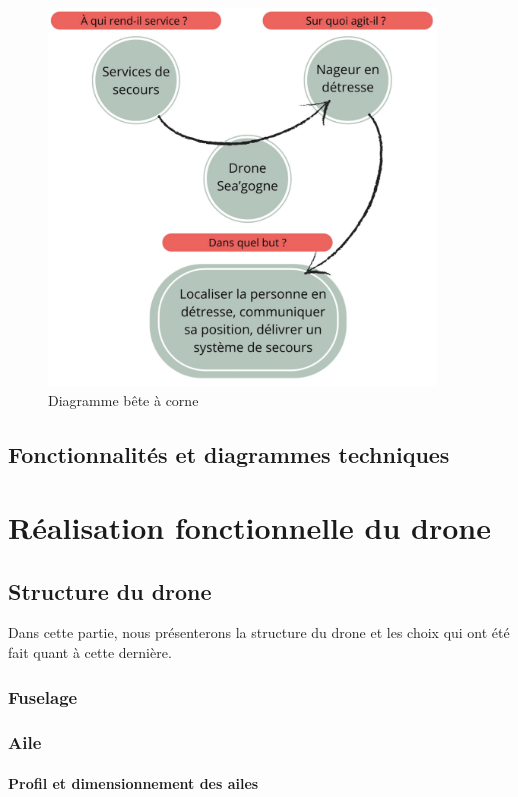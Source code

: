 \documentclass[a4paper,12pt,french]{report}
\begin{document}
\begin{figure}[h]
    \centering
    \includegraphics[height=10cm]{figures/bete.png}
    \caption{Diagramme bête à corne}
    \label{bete}
\end{figure}

\section{Fonctionnalités et diagrammes techniques}

\chapter{Réalisation fonctionnelle du drone}

\section{Structure du drone}

Dans cette partie, nous présenterons la structure du drone et les choix qui ont été fait quant à cette dernière.

\subsection{Fuselage}

\subsection{Aile}

\subsubsection*{Profil et dimensionnement des ailes}
\end{document}
